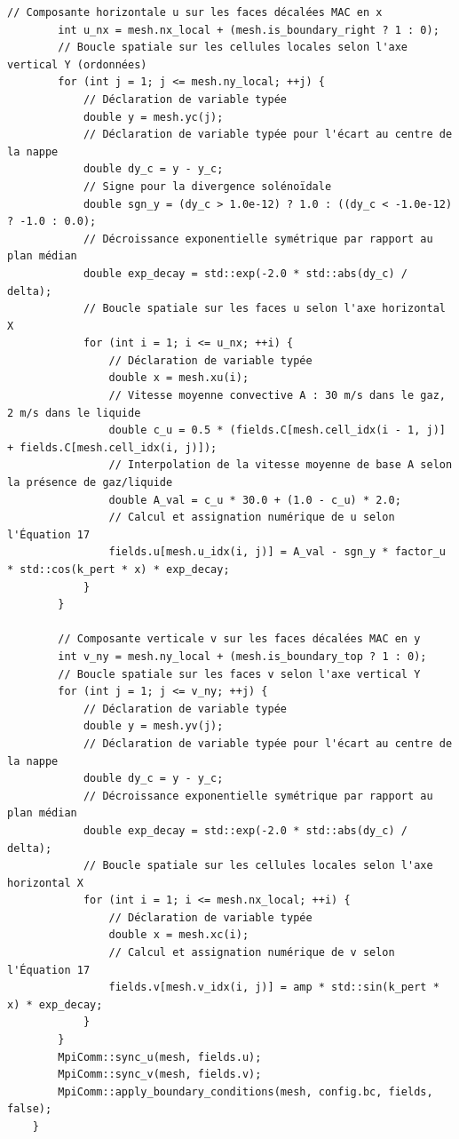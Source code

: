 \documentclass[10pt,a4paper,oneside]{book}
\begin{document}
\begin{lstlisting}[language={[11]C++}]
        // Composante horizontale u sur les faces décalées MAC en x
        int u_nx = mesh.nx_local + (mesh.is_boundary_right ? 1 : 0);
        // Boucle spatiale sur les cellules locales selon l'axe vertical Y (ordonnées)
        for (int j = 1; j <= mesh.ny_local; ++j) {
            // Déclaration de variable typée
            double y = mesh.yc(j);
            // Déclaration de variable typée pour l'écart au centre de la nappe
            double dy_c = y - y_c;
            // Signe pour la divergence solénoïdale
            double sgn_y = (dy_c > 1.0e-12) ? 1.0 : ((dy_c < -1.0e-12) ? -1.0 : 0.0);
            // Décroissance exponentielle symétrique par rapport au plan médian
            double exp_decay = std::exp(-2.0 * std::abs(dy_c) / delta);
            // Boucle spatiale sur les faces u selon l'axe horizontal X
            for (int i = 1; i <= u_nx; ++i) {
                // Déclaration de variable typée
                double x = mesh.xu(i);
                // Vitesse moyenne convective A : 30 m/s dans le gaz, 2 m/s dans le liquide
                double c_u = 0.5 * (fields.C[mesh.cell_idx(i - 1, j)] + fields.C[mesh.cell_idx(i, j)]);
                // Interpolation de la vitesse moyenne de base A selon la présence de gaz/liquide
                double A_val = c_u * 30.0 + (1.0 - c_u) * 2.0;
                // Calcul et assignation numérique de u selon l'Équation 17
                fields.u[mesh.u_idx(i, j)] = A_val - sgn_y * factor_u * std::cos(k_pert * x) * exp_decay;
            }
        }

        // Composante verticale v sur les faces décalées MAC en y
        int v_ny = mesh.ny_local + (mesh.is_boundary_top ? 1 : 0);
        // Boucle spatiale sur les faces v selon l'axe vertical Y
        for (int j = 1; j <= v_ny; ++j) {
            // Déclaration de variable typée
            double y = mesh.yv(j);
            // Déclaration de variable typée pour l'écart au centre de la nappe
            double dy_c = y - y_c;
            // Décroissance exponentielle symétrique par rapport au plan médian
            double exp_decay = std::exp(-2.0 * std::abs(dy_c) / delta);
            // Boucle spatiale sur les cellules locales selon l'axe horizontal X
            for (int i = 1; i <= mesh.nx_local; ++i) {
                // Déclaration de variable typée
                double x = mesh.xc(i);
                // Calcul et assignation numérique de v selon l'Équation 17
                fields.v[mesh.v_idx(i, j)] = amp * std::sin(k_pert * x) * exp_decay;
            }
        }
        MpiComm::sync_u(mesh, fields.u);
        MpiComm::sync_v(mesh, fields.v);
        MpiComm::apply_boundary_conditions(mesh, config.bc, fields, false);
    }


\end{lstlisting}
\end{document}
